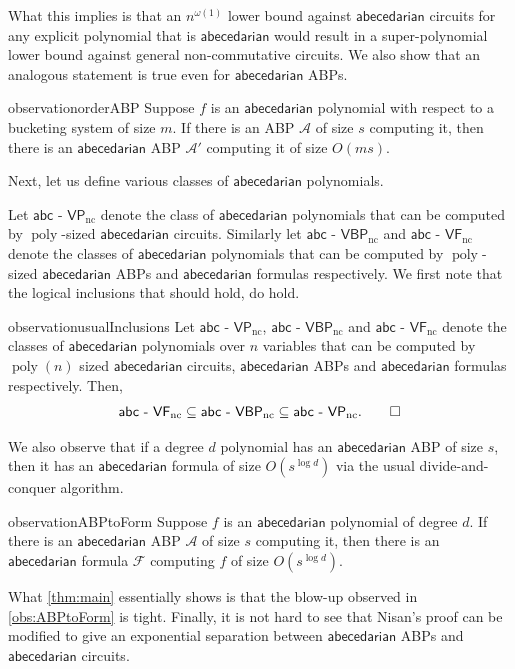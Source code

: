 \documentclass[10pt,a4paper]{article}
\def\poly{\operatorname{poly}}
\newcommand{\form}{\textbf{$\mathcal{F}$}}
\newcommand{\abp}{\textbf{$\mathcal{A}$}}
\newcommand{\abcd}{\mathsf{abecedarian}}
\def\abcncVF{\mathsf{abc \text{ - } VF}_{\text{nc}}}
\def\abcncVBP{\mathsf{abc \text{ - } VBP}_{\text{nc}}}
\def\abcncVP{\mathsf{abc \text{ - } VP}_{\text{nc}}}
\begin{document}
\noindent What this implies is that an $n^{\omega(1)}$ lower bound against $\abcd$ circuits for any explicit polynomial that is $\abcd$ would result in a super-polynomial lower bound against general non-commutative circuits.
We also show that an analogous statement is true even for $\abcd$ ABPs.

\begin{restatable}{observation}{orderABP}\label{obs:orderABP}
	Suppose $f$ is an $\abcd$ polynomial with respect to a bucketing system of size $m$. If there is an ABP $\abp$ of size $s$ computing it, then there is an $\abcd$ ABP $\abp'$ computing it of size $O(ms)$.
\end{restatable}

\noindent Next, let us define various classes of $\abcd$ polynomials. 

Let $\abcncVP$ denote the class of $\abcd$ polynomials that can be computed by $\poly$-sized $\abcd$ circuits. 
Similarly let $\abcncVBP$ and $\abcncVF$ denote the classes of $\abcd$ polynomials that can be computed by $\poly$-sized $\abcd$ ABPs and $\abcd$ formulas respectively. 
We first note that the logical inclusions that should hold, do hold.

\begin{restatable}{observation}{usualInclusions}\label{obs:usualInclusions}
	Let $\abcncVP$, $\abcncVBP$ and $\abcncVF$ denote the classes of $\abcd$ polynomials over $n$ variables that can be computed by $\poly(n)$ sized $\abcd$ circuits, $\abcd$ ABPs and $\abcd$ formulas respectively.
	Then,
	\[
		\abcncVF \subseteq \abcncVBP \subseteq \abcncVP. \qedhere	
	\]
\end{restatable}

\noindent We also observe that if a degree $d$ polynomial has an $\abcd$ ABP of size $s$, then it has an $\abcd$ formula of size $O(s^{\log d})$ via the usual divide-and-conquer algorithm. 

\begin{restatable}{observation}{ABPtoForm}\label{obs:ABPtoForm}
	Suppose $f$ is an $\abcd$ polynomial of degree $d$. If there is an $\abcd$ ABP $\abp$ of size $s$ computing it, then there is an $\abcd$ formula $\form$ computing $f$ of size $O(s^{\log d})$.
\end{restatable}

\noindent What \autoref{thm:main} essentially shows is that the blow-up observed in \autoref{obs:ABPtoForm} is tight.
Finally, it is not hard to see that Nisan's proof can be modified to give an exponential separation between $\abcd$ ABPs and $\abcd$ circuits. 
\end{document}
